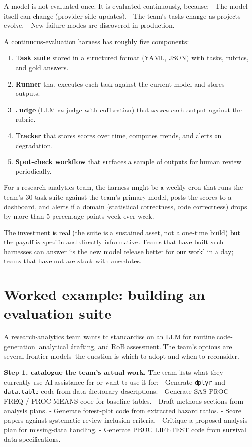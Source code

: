 \documentclass[
  letterpaper,
  11pt]{scrbook}
\providecommand{\tightlist}{%
  \setlength{\itemsep}{0pt}\setlength{\parskip}{0pt}}
\begin{document}
A model is not evaluated once. It is evaluated continuously, because: -
The model itself can change (provider-side updates). - The team's tasks
change as projects evolve. - New failure modes are discovered in
production.

A continuous-evaluation harness has roughly five components:

\begin{enumerate}
\def\labelenumi{\arabic{enumi}.}
\tightlist
\item
  \textbf{Task suite} stored in a structured format (YAML, JSON) with
  tasks, rubrics, and gold answers.
\item
  \textbf{Runner} that executes each task against the current model and
  stores outputs.
\item
  \textbf{Judge} (LLM-as-judge with calibration) that scores each output
  against the rubric.
\item
  \textbf{Tracker} that stores scores over time, computes trends, and
  alerts on degradation.
\item
  \textbf{Spot-check workflow} that surfaces a sample of outputs for
  human review periodically.
\end{enumerate}

For a research-analytics team, the harness might be a weekly cron that
runs the team's 30-task suite against the team's primary model, posts
the scores to a dashboard, and alerts if a domain (statistical
correctness, code correctness) drops by more than 5 percentage points
week over week.

The investment is real (the suite is a sustained asset, not a one-time
build) but the payoff is specific and directly informative. Teams that
have built such harnesses can answer `is the new model release better
for our work' in a day; teams that have not are stuck with anecdotes.

\section{Worked example: building an evaluation
suite}\label{worked-example-building-an-evaluation-suite}

A research-analytics team wants to standardise on an LLM for routine
code-generation, analytical drafting, and RoB assessment. The team's
options are several frontier models; the question is which to adopt and
when to reconsider.

\textbf{Step 1: catalogue the team's actual work.} The team lists what
they currently use AI assistance for or want to use it for: - Generate
\texttt{dplyr} and \texttt{data.table} code from data-dictionary
descriptions. - Generate SAS PROC FREQ / PROC MEANS code for baseline
tables. - Draft methods sections from analysis plans. - Generate
forest-plot code from extracted hazard ratios. - Score papers against
systematic-review inclusion criteria. - Critique a proposed analysis
plan for missing-data handling. - Generate PROC LIFETEST code from
survival data specifications.
\end{document}
